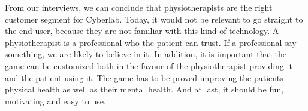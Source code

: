 From our interviews, we can conclude that physiotherapists are the right customer segment for Cyberlab. Today, it would not be relevant to go straight to the end user, because they are not familiar with this kind of technology. A physiotherapist is a professional who the patient can trust. If a professional say something, we are likely to believe in it. In addition, it is important that the game can be customized both in the favour of the physiotherapist providing it and the patient using it. The game has to be proved improving the patients physical health as well as their mental health. And at last, it should be fun, motivating and easy to use. 


